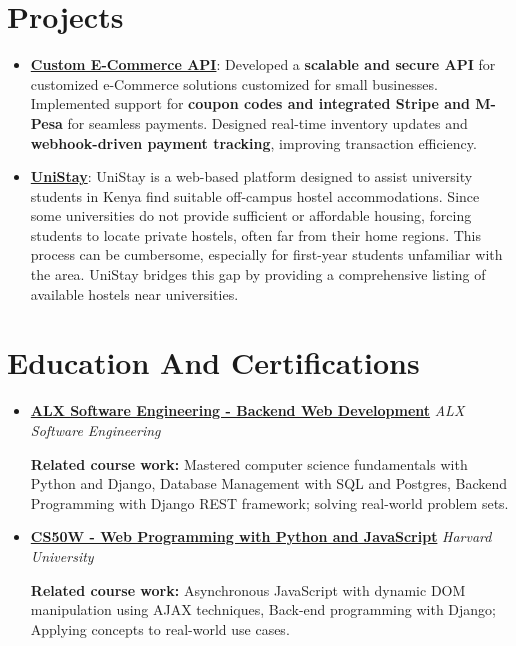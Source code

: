 \documentclass[letterpaper,11pt]{article}
\newcommand{\resumeItem}[2]{
  \item\small{
    \textbf{#1}{: #2 \vspace{-2pt}}
  }
}
\newcommand{\resumeSubHeadingListStart}{\begin{itemize}[leftmargin=*]}
\newcommand{\resumeSubHeadingListEnd}{\end{itemize}}
\begin{document}
\section*{Projects}
\resumeSubHeadingListStart
   \resumeItem{\href{https://github.com/Mr-waweru/Custom-E-Commerce-API.git}{Custom E-Commerce API}}{Developed a \textbf{scalable and secure API} for customized e-Commerce solutions customized for small businesses. Implemented support for \textbf{coupon codes and integrated Stripe and M-Pesa} for seamless payments. Designed real-time inventory updates and \textbf{webhook-driven payment tracking}, improving transaction efficiency.}
   \resumeItem{\href{https://github.com/Mr-waweru/UniStay.git}{UniStay}}{UniStay is a web-based platform designed to assist university students in Kenya find suitable off-campus hostel accommodations. Since some universities do not provide sufficient or affordable housing, forcing students to locate private hostels, often far from their home regions. This process can be cumbersome, especially for first-year students unfamiliar with the area. UniStay bridges this gap by providing a comprehensive listing of available hostels near universities.}
\resumeSubHeadingListEnd

\section*{Education And Certifications}
\begin{itemize}[leftmargin=0.15in]
  \item \textbf{\href{https://intranet.alxswe.com/certificates/CGeSsTnfPR}{ALX Software Engineering - Backend Web Development}} \hfill \textit{ALX Software Engineering}\\
    \begin{itemize}
      \textbf{Related course work: }Mastered computer science fundamentals with Python and Django, Database Management with SQL and Postgres, Backend Programming with Django REST framework; solving real-world problem sets.
    \end{itemize}
    \item \textbf{\href{https://certificates.cs50.io/9e725d06-1c5a-40a4-8bf4-f53c6fc59991.pdf?size=letter}{CS50W - Web Programming with Python and JavaScript}} \hfill \textit{Harvard University}\\
    \begin{itemize}
      \textbf{Related course work: }Asynchronous JavaScript with dynamic DOM manipulation using AJAX techniques, Back-end programming with Django; Applying concepts to real-world use cases.
    \end{itemize}
\end{itemize}
\end{document}
